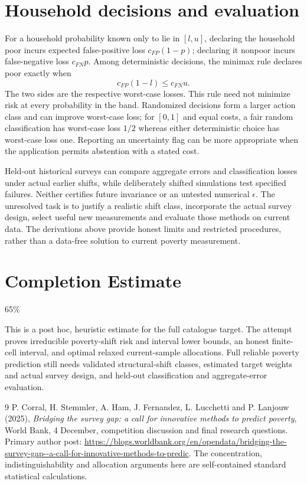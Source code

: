 \documentclass[11pt,a4paper]{article}
\begin{document}
\section{Household decisions and evaluation}
For a household probability known only to lie in $[l,u]$, declaring the household poor incurs expected false-positive loss $c_{FP}(1-p)$; declaring it nonpoor incurs false-negative loss $c_{FN}p$. Among deterministic decisions, the minimax rule declares poor exactly when
\[
 c_{FP}(1-l)\le c_{FN}u.
\]
The two sides are the respective worst-case losses. This rule need not minimize risk at every probability in the band. Randomized decisions form a larger action class and can improve worst-case loss; for $[0,1]$ and equal costs, a fair random classification has worst-case loss $1/2$ whereas either deterministic choice has worst-case loss one. Reporting an uncertainty flag can be more appropriate when the application permits abstention with a stated cost.

Held-out historical surveys can compare aggregate errors and classification losses under actual earlier shifts, while deliberately shifted simulations test specified failures. Neither certifies future invariance or an untested numerical $\epsilon$. The unresolved task is to justify a realistic shift class, incorporate the actual survey design, select useful new measurements and evaluate those methods on current data. The derivations above provide honest limits and restricted procedures, rather than a data-free solution to current poverty measurement.

\section{Completion Estimate}
65\%

This is a post hoc, heuristic estimate for the full catalogue target.
The attempt proves irreducible poverty-shift risk and interval lower bounds, an honest finite-cell interval, and optimal relaxed current-sample allocations. Full reliable poverty prediction still needs validated structural-shift classes, estimated target weights and actual survey design, and held-out classification and aggregate-error evaluation.

\begin{thebibliography}{9}
 P. Corral, H. Stemmler, A. Ham, J. Fernandez, L. Lucchetti and P. Lanjouw (2025), \emph{Bridging the survey gap: a call for innovative methods to predict poverty}, World Bank, 4 December, competition discussion and final research questions. Primary author post: \url{https://blogs.worldbank.org/en/opendata/bridging-the-survey-gap--a-call-for-innovative-methods-to-predic}. The concentration, indistinguishability and allocation arguments here are self-contained standard statistical calculations.
\end{thebibliography}
\end{document}
